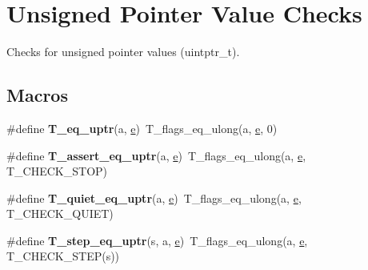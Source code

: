\hypertarget{group__RTEMSTestFrameworkChecksUIntptr}{}\section{Unsigned Pointer Value Checks}
\label{group__RTEMSTestFrameworkChecksUIntptr}


Checks for unsigned pointer values (uintptr\+\_\+t).  


\subsection*{Macros}
\begin{DoxyCompactItemize}
\item 
\mbox{\label{group__RTEMSTestFrameworkChecksUIntptr_ga1fc05fa21e319d119386835f8204d6ec}} 
\#define {\bfseries T\+\_\+eq\+\_\+uptr}(a,  \mbox{\hyperlink{sun4u_2tte_8h_a8b0b9ed08e0e18920ec2682f48228c27}{e}})~T\+\_\+flags\+\_\+eq\+\_\+ulong(a, \mbox{\hyperlink{sun4u_2tte_8h_a8b0b9ed08e0e18920ec2682f48228c27}{e}}, 0)
\item 
\mbox{\label{group__RTEMSTestFrameworkChecksUIntptr_ga80532f205638f8cbe8ad92c0977e3901}} 
\#define {\bfseries T\+\_\+assert\+\_\+eq\+\_\+uptr}(a,  \mbox{\hyperlink{sun4u_2tte_8h_a8b0b9ed08e0e18920ec2682f48228c27}{e}})~T\+\_\+flags\+\_\+eq\+\_\+ulong(a, \mbox{\hyperlink{sun4u_2tte_8h_a8b0b9ed08e0e18920ec2682f48228c27}{e}}, T\+\_\+\+C\+H\+E\+C\+K\+\_\+\+S\+T\+OP)
\item 
\mbox{\label{group__RTEMSTestFrameworkChecksUIntptr_gac1c19e74df478394f0de4d35f20937a6}} 
\#define {\bfseries T\+\_\+quiet\+\_\+eq\+\_\+uptr}(a,  \mbox{\hyperlink{sun4u_2tte_8h_a8b0b9ed08e0e18920ec2682f48228c27}{e}})~T\+\_\+flags\+\_\+eq\+\_\+ulong(a, \mbox{\hyperlink{sun4u_2tte_8h_a8b0b9ed08e0e18920ec2682f48228c27}{e}}, T\+\_\+\+C\+H\+E\+C\+K\+\_\+\+Q\+U\+I\+ET)
\item 
\mbox{\label{group__RTEMSTestFrameworkChecksUIntptr_ga8607c737c2b8d2bf936213d9be706c79}} 
\#define {\bfseries T\+\_\+step\+\_\+eq\+\_\+uptr}(s,  a,  \mbox{\hyperlink{sun4u_2tte_8h_a8b0b9ed08e0e18920ec2682f48228c27}{e}})~T\+\_\+flags\+\_\+eq\+\_\+ulong(a, \mbox{\hyperlink{sun4u_2tte_8h_a8b0b9ed08e0e18920ec2682f48228c27}{e}}, T\+\_\+\+C\+H\+E\+C\+K\+\_\+\+S\+T\+EP(s))

\end{DoxyCompactItemize}
